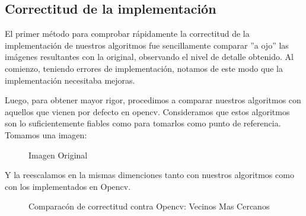 \subsection{Correctitud de la implementación}

El primer método para comprobar rápidamente la correctitud de la implementación de nuestros algoritmos fue sencillamente comparar ''a ojo'' las imágenes resultantes con la original, observando el nivel de detalle obtenido. Al comienzo, teniendo errores de implementación, notamos de este modo que la implementación necesitaba mejoras.

Luego, para obtener mayor rigor, procedimos a comparar nuestros algoritmos con aquellos que vienen por defecto en opencv. Consideramos que estos algoritmos son lo suficientemente fiables como para tomarlos como punto de referencia. Tomamos una imagen:
\begin{figure}[H]
    \centering
{}
\caption{Imagen Original}
\end{figure}
Y la reescalamos en la mismas dimenciones tanto con nuestros algoritmos como con los implementados en Opencv.

\begin{figure}[H]
    \centering
    \qquad
    \caption{Comparacón de correctitud contra Opencv: Vecinos Mas Cercanos}
\end{figure}

